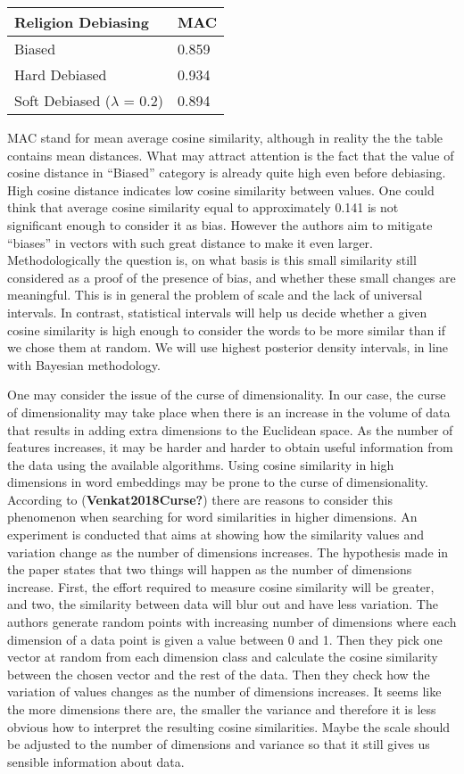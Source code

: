 \documentclass[
  10pt,
  dvipsnames,enabledeprecatedfontcommands, twocolumn]{scrartcl}
\begin{document}
\begin{longtable}[]{@{}ll@{}}
\toprule
Religion Debiasing & MAC \\
\midrule
\endhead
Biased & 0.859 \\
Hard Debiased & 0.934 \\
Soft Debiased (\(\lambda\) = 0.2) & 0.894 \\
\bottomrule
\end{longtable}

MAC stand for mean average cosine similarity, although in reality the
the table contains mean distances. What may attract attention is the
fact that the value of cosine distance in ``Biased'' category is already
quite high even before debiasing. High cosine distance indicates low
cosine similarity between values. One could think that average cosine
similarity equal to approximately 0.141 is not significant enough to
consider it as bias. However the authors aim to mitigate ``biases'' in
vectors with such great distance to make it even larger.
Methodologically the question is, on what basis is this small similarity
still considered as a proof of the presence of bias, and whether these
small changes are meaningful. This is in general the problem of scale
and the lack of universal intervals. In contrast, statistical intervals
will help us decide whether a given cosine similarity is high enough to
consider the words to be more similar than if we chose them at random.
We will use highest posterior density intervals, in line with Bayesian
methodology.

One may consider the issue of the curse of dimensionality. In our case,
the curse of dimensionality may take place when there is an increase in
the volume of data that results in adding extra dimensions to the
Euclidean space. As the number of features increases, it may be harder
and harder to obtain useful information from the data using the
available algorithms. Using cosine similarity in high dimensions in word
embeddings may be prone to the curse of dimensionality. According to
(\textbf{Venkat2018Curse?}) there are reasons to consider this
phenomenon when searching for word similarities in higher dimensions. An
experiment is conducted that aims at showing how the similarity values
and variation change as the number of dimensions increases. The
hypothesis made in the paper states that two things will happen as the
number of dimensions increase. First, the effort required to measure
cosine similarity will be greater, and two, the similarity between data
will blur out and have less variation. The authors generate random
points with increasing number of dimensions where each dimension of a
data point is given a value between 0 and 1. Then they pick one vector
at random from each dimension class and calculate the cosine similarity
between the chosen vector and the rest of the data. Then they check how
the variation of values changes as the number of dimensions increases.
It seems like the more dimensions there are, the smaller the variance
and therefore it is less obvious how to interpret the resulting cosine
similarities. Maybe the scale should be adjusted to the number of
dimensions and variance so that it still gives us sensible information
about data.
\end{document}
